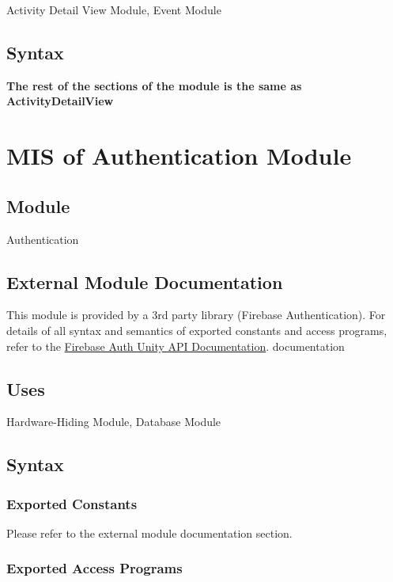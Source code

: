 \documentclass[12pt, titlepage]{article}
\begin{document}
Activity Detail View Module, Event Module

\subsection{Syntax}
\textbf{The rest of the sections of the module is the same as ActivityDetailView}

\newpage

\section{MIS of Authentication Module} \label{mAuth}

\subsection{Module}

Authentication

\subsection{External Module Documentation}

This module is provided by a 3rd party library (Firebase Authentication). For details of all syntax and semantics of exported constants and access programs, refer to the \href{https://firebase.google.com/docs/reference/unity/namespace/firebase/auth}{Firebase Auth Unity API Documentation}.
documentation

\subsection{Uses}

Hardware-Hiding Module, Database Module

\subsection{Syntax}

\subsubsection{Exported Constants}

Please refer to the external module documentation section.

\subsubsection{Exported Access Programs}
\end{document}
